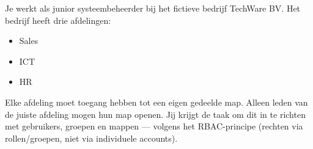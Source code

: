 Je werkt als junior systeembeheerder bij het fictieve bedrijf TechWare BV.
Het bedrijf heeft drie afdelingen:
\begin{itemize}
\item Sales
\item ICT
\item HR
\end{itemize}
Elke afdeling moet toegang hebben tot een eigen gedeelde map. Alleen leden van de juiste afdeling mogen hun map openen.
Jij krijgt de taak om dit in te richten met gebruikers, groepen en mappen — volgens het RBAC-principe (rechten via rollen/groepen, niet via individuele accounts).
